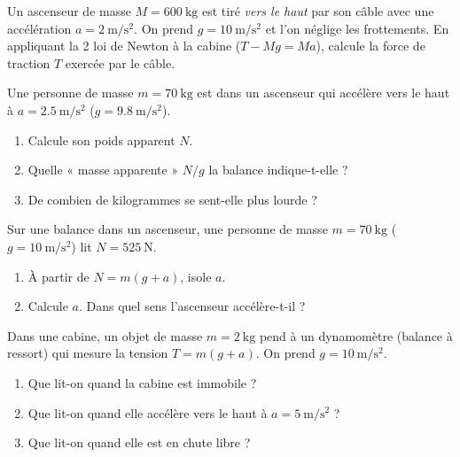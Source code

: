 \documentclass[11pt,a4paper]{article}
\begin{document}

\begin{exo}
Un ascenseur de masse $M=\qty{600}{\kilogram}$ est tiré \emph{vers le haut} par son
câble avec une accélération $a=\qty{2}{\metre\per\second\squared}$. On prend
$g=\qty{10}{\metre\per\second\squared}$ et l'on néglige les frottements. En appliquant
la 2 loi de Newton à la cabine ($T-Mg=Ma$), calcule la force de traction $T$
exercée par le câble.
\end{exo}

\begin{exo}
Une personne de masse $m=\qty{70}{\kilogram}$ est dans un ascenseur qui accélère vers
le haut à $a=\qty{2.5}{\metre\per\second\squared}$ ($g=\qty{9.8}{\metre\per\second\squared}$).
\begin{enumerate}[label=\alph*)]
  \item Calcule son poids apparent $N$.
  \item Quelle « masse apparente » $N/g$ la balance indique-t-elle ?
  \item De combien de kilogrammes se sent-elle plus lourde ?
\end{enumerate}
\end{exo}

\begin{exo}
Sur une balance dans un ascenseur, une personne de masse $m=\qty{70}{\kilogram}$
($g=\qty{10}{\metre\per\second\squared}$) lit $N=\qty{525}{\newton}$.
\begin{enumerate}[label=\alph*)]
  \item À partir de $N=m(g+a)$, isole $a$.
  \item Calcule $a$. Dans quel sens l'ascenseur accélère-t-il ?
\end{enumerate}
\end{exo}

\begin{exo}
Dans une cabine, un objet de masse $m=\qty{2}{\kilogram}$ pend à un dynamomètre
(balance à ressort) qui mesure la tension $T=m(g+a)$. On prend
$g=\qty{10}{\metre\per\second\squared}$.
\begin{enumerate}[label=\alph*)]
  \item Que lit-on quand la cabine est immobile ?
  \item Que lit-on quand elle accélère vers le haut à $a=\qty{5}{\metre\per\second\squared}$ ?
  \item Que lit-on quand elle est en chute libre ?
\end{enumerate}
\end{exo}
\end{document}
